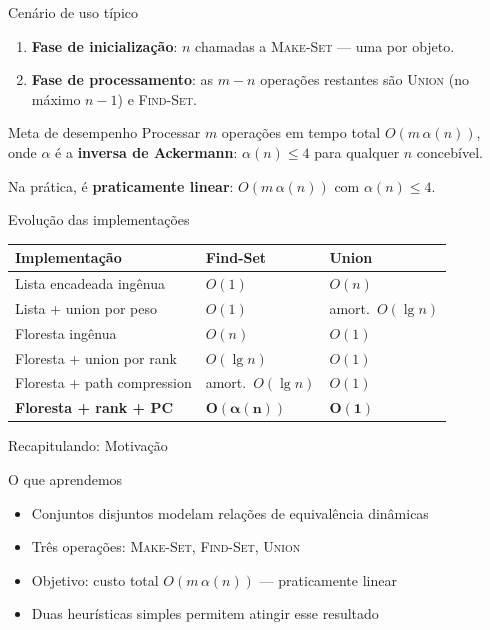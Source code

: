\documentclass[aspectratio=169]{beamer}
\begin{document}
\begin{frame}{Cenário de uso típico}%
  \begin{enumerate}
    \item \textbf{Fase de inicialização}: $n$ chamadas a \textsc{Make-Set} — uma por objeto.
    \item \textbf{Fase de processamento}: as $m-n$ operações restantes são \textsc{Union} (no máximo $n-1$) e \textsc{Find-Set}.
  \end{enumerate}
  \vspace{0.4cm}
  \begin{exampleblock}{Meta de desempenho}
    Processar $m$ operações em tempo total $O(m\,\alpha(n))$,\\
    onde $\alpha$ é a \textbf{inversa de Ackermann}: $\alpha(n)\leq 4$ para qualquer $n$ concebível.
  \end{exampleblock}
  \vspace{0.3cm}
  \begin{center}
    Na prática, é \textbf{praticamente linear}: $O(m\,\alpha(n))$ com $\alpha(n)\leq 4$.
  \end{center}
\end{frame}

\begin{frame}{Evolução das implementações}%
  \begin{center}
  \renewcommand{\arraystretch}{1.4}
  \begin{tabular}{lll}
    \toprule
    \textbf{Implementação} & \textbf{Find-Set} & \textbf{Union} \\
    \midrule
    Lista encadeada ingênua        & $O(1)$         & $O(n)$ \\
    Lista + union por peso         & $O(1)$         & amort.\ $O(\lg n)$ \\
    Floresta ingênua               & $O(n)$         & $O(1)$ \\
    Floresta + union por rank      & $O(\lg n)$     & $O(1)$ \\
    Floresta + path compression    & amort.\ $O(\lg n)$ & $O(1)$ \\
    \textbf{Floresta + rank + PC}  & $\mathbf{O(\alpha(n))}$ & $\mathbf{O(1)}$ \\
    \bottomrule
  \end{tabular}
  \end{center}
\end{frame}

\begin{frame}{Recapitulando: Motivação}%
  \begin{block}{O que aprendemos}
    \begin{itemize}
      \item Conjuntos disjuntos modelam relações de equivalência dinâmicas
      \item Três operações: \textsc{Make-Set}, \textsc{Find-Set}, \textsc{Union}
      \item Objetivo: custo total $O(m\,\alpha(n))$ — praticamente linear
      \item Duas heurísticas simples permitem atingir esse resultado
    \end{itemize}
  \end{block}
\end{frame}
\end{document}
